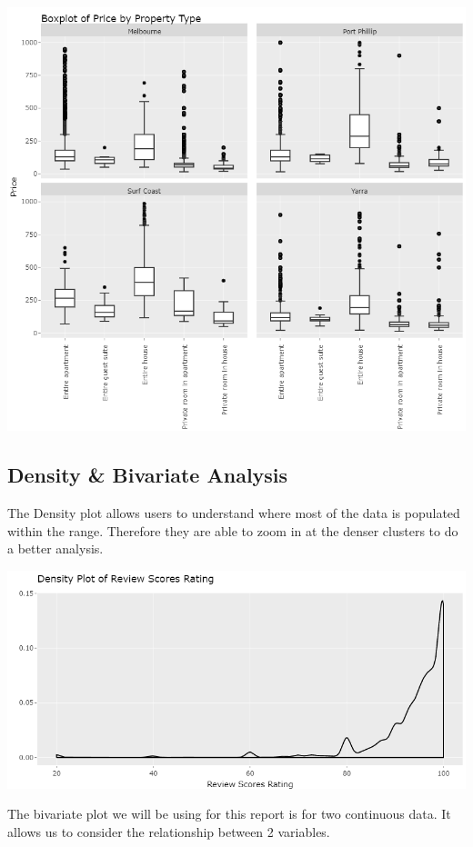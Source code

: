 \documentclass{acm_proc_article-sp}
\begin{document}
\includegraphics{images/boxplotvic.png}

\hypertarget{density-bivariate-analysis}{%
\subsection{Density \& Bivariate
Analysis}\label{density-bivariate-analysis}}

The Density plot allows users to understand where most of the data is
populated within the range. Therefore they are able to zoom in at the
denser clusters to do a better analysis.

\includegraphics{images/densityplot.png}

The bivariate plot we will be using for this report is for two
continuous data. It allows us to consider the relationship between 2
variables.
\end{document}
